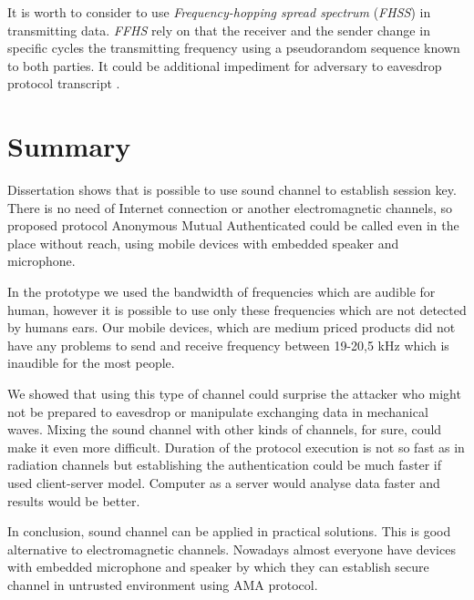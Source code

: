 \documentclass[11pt,titlepage]{article}
\theoremstyle{plain}
\begin{document}
\vspace{5mm}

It is worth to consider to use \textit{Frequency-hopping spread spectrum} (\textit{FHSS}) in transmitting data. \textit{FFHS} rely on that the receiver and the sender change in specific cycles the transmitting frequency using a pseudorandom sequence known to both parties. It could be additional impediment for adversary to eavesdrop protocol transcript \cite{fhss}.  
\section{Summary}

Dissertation shows that is possible to use sound channel to establish session key. There is no need of Internet connection or another electromagnetic channels, so proposed protocol Anonymous Mutual Authenticated could be called even in the place without reach, using mobile devices with embedded speaker and microphone. 

\vspace{5mm}


In the prototype we used the bandwidth of frequencies which are audible for human, however it is possible to use only these frequencies which are not detected by humans ears. Our mobile devices, which are medium priced products did not have any problems to send and receive frequency between 19-20,5 kHz which is inaudible for the most people.

\vspace{5mm}

We showed that using this type of channel could surprise the attacker who might not be prepared to eavesdrop or manipulate exchanging data in mechanical waves. Mixing the sound channel with other kinds of channels, for sure, could make it even more difficult. Duration of the protocol execution is not so fast as in radiation channels but establishing the authentication could be much faster if used client-server model. Computer as a server would analyse data faster and results would be better.

\vspace{5mm}

In conclusion, sound channel can be applied in practical solutions. This is good alternative to electromagnetic channels. Nowadays almost everyone have devices with embedded microphone and speaker by which they can establish secure channel in untrusted environment using AMA protocol.






\end{document}
